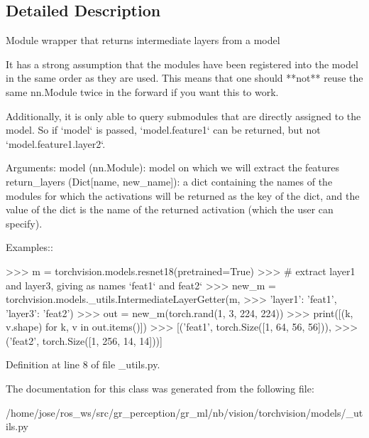 \subsection{Detailed Description}
\begin{DoxyVerb}Module wrapper that returns intermediate layers from a model

It has a strong assumption that the modules have been registered
into the model in the same order as they are used.
This means that one should **not** reuse the same nn.Module
twice in the forward if you want this to work.

Additionally, it is only able to query submodules that are directly
assigned to the model. So if `model` is passed, `model.feature1` can
be returned, but not `model.feature1.layer2`.

Arguments:
    model (nn.Module): model on which we will extract the features
    return_layers (Dict[name, new_name]): a dict containing the names
        of the modules for which the activations will be returned as
        the key of the dict, and the value of the dict is the name
        of the returned activation (which the user can specify).

Examples::

    >>> m = torchvision.models.resnet18(pretrained=True)
    >>> # extract layer1 and layer3, giving as names `feat1` and feat2`
    >>> new_m = torchvision.models._utils.IntermediateLayerGetter(m,
    >>>     {'layer1': 'feat1', 'layer3': 'feat2'})
    >>> out = new_m(torch.rand(1, 3, 224, 224))
    >>> print([(k, v.shape) for k, v in out.items()])
    >>>     [('feat1', torch.Size([1, 64, 56, 56])),
    >>>      ('feat2', torch.Size([1, 256, 14, 14]))]
\end{DoxyVerb}
 

Definition at line 8 of file \+\_\+utils.\+py.



The documentation for this class was generated from the following file\+:\begin{DoxyCompactItemize}
\item 
/home/jose/ros\+\_\+ws/src/gr\+\_\+perception/gr\+\_\+ml/nb/vision/torchvision/models/\+\_\+utils.\+py\end{DoxyCompactItemize}
